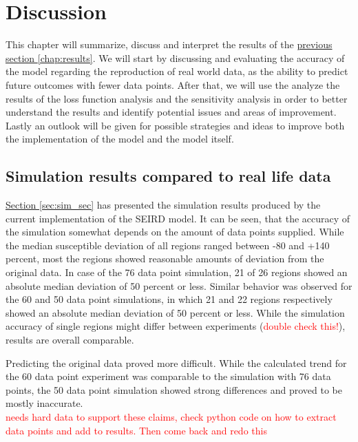 
\chapter{Discussion} %
\label{chap:discussion} %

This chapter will summarize, discuss and interpret the results of the \hyperref[chap:results]{previous section
\ref*{chap:results}}. We will start by discussing and evaluating the accuracy of the model regarding the reproduction
of real world data, as the ability to predict future outcomes with fewer data points. After that, we will use the
analyze the results of the loss function analysis and the sensitivity analysis in order to better understand the results
and identify potential issues and areas of improvement. Lastly an outlook will be given for possible strategies and
ideas to improve both the implementation of the model and the model itself.

\section{Simulation results compared to real life data}
\hyperref[sec:sim_res]{Section \ref*{sec:sim_sec}} has presented the simulation results produced by the current implementation
of the SEIRD model. It can be seen, that the accuracy of the simulation somewhat depends on the amount of data points supplied.
While the median susceptible deviation of all regions ranged between -80 and +140 percent, most the regions showed reasonable
amounts of deviation from the original data. In case of the 76 data point simulation, 21 of 26 regions showed an
absolute median deviation of 50 percent or less. Similar behavior was observed for the 60 and 50 data point simulations, in which
21 and 22 regions respectively showed an absolute median deviation of 50 percent or less. While the simulation accuracy of single regions
might differ between experiments (\textcolor{red}{double check this!}), results are overall comparable.

Predicting the original data proved more difficult. While the calculated trend for the 60 data point experiment was comparable
to the simulation with 76 data points, the 50 data point simulation showed strong differences and proved to be mostly inaccurate.\\
\textcolor{red}{needs hard data to support these claims, check python code on how to extract data points and add to results.
Then come back and redo this}\\ %

